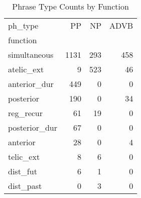 \begin{table}[htbp!]
\centering
\caption{Phrase Type Counts by Function}
\label{table:funcpt_ct}
\begin{tabular}{lrrr}
\toprule
ph\_type &    PP &   NP &  ADVB \\
function      &       &      &       \\
\midrule
simultaneous  &  1131 &  293 &   458 \\
atelic\_ext    &     9 &  523 &    46 \\
anterior\_dur  &   449 &    0 &     0 \\
posterior     &   190 &    0 &    34 \\
reg\_recur     &    61 &   19 &     0 \\
posterior\_dur &    67 &    0 &     0 \\
anterior      &    28 &    0 &     4 \\
telic\_ext     &     8 &    6 &     0 \\
dist\_fut      &     6 &    1 &     0 \\
dist\_past     &     0 &    3 &     0 \\
\bottomrule
\end{tabular}
\end{table}
